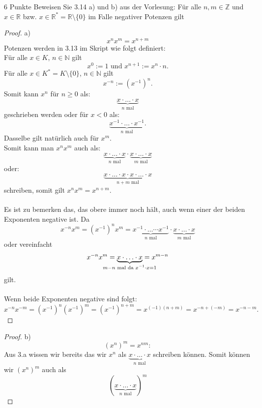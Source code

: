 \documentclass{problemset}
\begin{document}
\begin{problem}{6 Punkte}
Beweisen Sie 3.14 a) und b) aus der Vorlesung:
\newline\newline
Für alle $n,m \in \mathbb{Z}$ und $x \in \mathbb{R}$ bzw. $x \in \mathbb{R}^* = \mathbb{R}\setminus\{0\}$ im Falle negativer Potenzen gilt
\begin{proof}
	a)
	\begin{displaymath}
		x^nx^m = x^{n+m}
	\end{displaymath}
	Potenzen werden in 3.13 im Skript wie folgt definiert: \\
	Für alle $x \in K$, $n \in \mathbb{N}$ gilt
	\[
		x^0 := 1 \text{ und } x^{n+1}:=x^n \cdot n.
	\]
	Für alle $x \in K^*=K\setminus\{0\}$, $n \in \mathbb{N}$ gilt \[
		x^{-n} := (x^{-1})^n.
	\]
	Somit kann $x^n$ für $n \ge 0$ als: \[
		\underbrace{x \cdot \ldots \cdot x}_{n\text{ mal}}
	\] geschrieben werden oder für $x < 0$ als: \[
		\underbrace{x^{-1} \cdot \ldots \cdot x^{-1}}_{n\text{ mal}}.
	\]
	Dasselbe gilt natürlich auch für $x^m$. \\
	Somit kann man $x^nx^m$ auch als: \[
		\underbrace{x \cdot \ldots \cdot x}_{n\text{ mal}} \cdot \underbrace{x \cdot \ldots \cdot x}_{m\text{ mal}}
	\] oder: \[
		\underbrace{x \cdot \ldots \cdot x \cdot x \cdot \ldots \cdot x}_{n+m\text{ mal}}
	\] schreiben, somit gilt $x^nx^m = x^{n+m}$. \\
	\\
	Es ist zu bemerken das, das obere immer noch hält, auch wenn einer der beiden Exponenten negative ist.
	Da \[
		x^{-n}x^m = {(x^{-1})}^nx^m = \underbrace{x^{-1} \cdot\ldots\cdots x^{-1}}_{n\text{ mal}} \cdot \underbrace{x \cdot \ldots \cdot x}_{m\text{ mal}}
	\] oder vereinfacht \[
		x^{-n}x^m = \underbrace{x \cdot \ldots \cdot x}_{\mathclap{m - n\text{ mal da } x^{-1} \cdot x = 1}} = x^{m-n}
	\] gilt. \\
	\\
	Wenn beide Exponenten negative sind folgt: \[
		x^{-n}x^{-m} = {(x^{-1})}^n{(x^{-1})}^m = {(x^{-1})}^{n+m} = x^{(-1)(n+m)} = x^{-n+(-m)} = x^{-n-m}.
	\]
\end{proof}
\begin{proof}
	b)
	\begin{displaymath}
		{(x^n)}^m = x^{nm}:
	\end{displaymath}
	Aus 3.a wissen wir bereits das wir $x^n$ als $\underbrace{x \cdot \ldots \cdot x}_{n\text{ mal}}$ schreiben können.
	Somit können wir ${(x^n)}^m$ auch als \[
		(\underbrace{x \cdot \ldots \cdot x}_{n\text{ mal}})^m
\]
\end{proof}
\end{problem}
\end{document}
